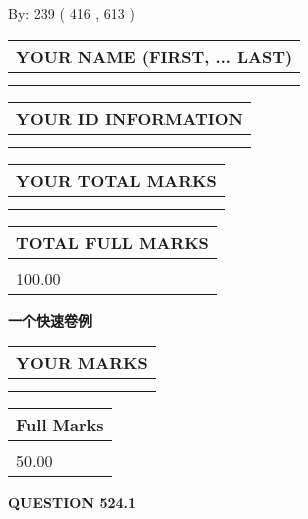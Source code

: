 \documentclass{ctexart}
\begin{document}
   
\hspace{1.0in} By: 
 239 ( 416 ,  613 )
   
   
   
   
\newpage 
\setcounter{page}{ 
   524001 } 
   
   
   
   
\noindent\begin{tabular}{|l|}
\hline
YOUR NAME (FIRST, ... LAST)  \\
\hline
 \\ 
 \\ 
\hline
\end{tabular}
\hspace{0.05in} \begin{tabular}{|l|}
\hline
 YOUR   ID   INFORMATION  \\
\hline
 \\ 
 \\ 
\hline
\end{tabular}
   
   
\vspace{0.2in}\noindent\begin{tabular}{|l|}
\hline
YOUR TOTAL MARKS  \\
\hline
 \\ 
 \\ 
\hline
\end{tabular}
\hspace{0.05in} \begin{tabular}{|l|}
\hline
TOTAL FULL MARKS  \\
\hline
 \\ 
100.00 \\
\hline
\end{tabular}
   
   
 \vspace{0.2in}
{\LARGE {\textbf{ 一个快速卷例}}}
   
   
  
\vspace{0.2in}
  
\noindent\begin{tabular}{|l|}
\hline
 YOUR MARKS  \\
\hline
 \\ 
 \\ 
\hline
\end{tabular}
\hspace{0.05in} \begin{tabular}{|l|}
\hline
 Full Marks  \\
\hline
 \\ 
50.00 \\
\hline
\end{tabular}
{\textbf{\Large{QUESTION
524.1 
}}}
  
\end{document}
